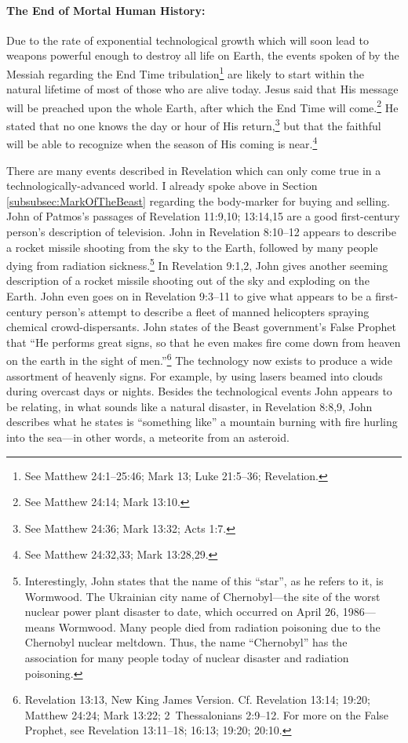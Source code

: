 \documentclass[letterpaper,12pt]{article}
\begin{document}
\paragraph{The End of Mortal Human History:}
\label{parag:EndOfMortalHumanHistory}

Due to the rate of exponential technological growth which will soon lead to weapons powerful enough to destroy all life on Earth, the events spoken of by the Messiah regarding the End Time tribulation\footnote{See Matthew 24:1--25:46; Mark 13; Luke 21:5--36; Revelation.} are likely to start within the natural lifetime of most of those who are alive today. Jesus said that His message will be preached upon the whole Earth, after which the End Time will come.\footnote{See Matthew 24:14; Mark 13:10.} He stated that no one knows the day or hour of His return,\footnote{See Matthew 24:36; Mark 13:32; Acts 1:7.} but that the faithful will be able to recognize when the season of His coming is near.\footnote{See Matthew 24:32,33; Mark 13:28,29.}

There are many events described in Revelation which can only come true in a technologically-advanced world. I already spoke above in Section \ref{subsubsec:MarkOfTheBeast} regarding the body-marker for buying and selling. John of Patmos's passages of Revelation 11:9,10; 13:14,15 are a good first-century person's description of television. John in Revelation 8:10--12 appears to describe a rocket missile shooting from the sky to the Earth, followed by many people dying from radiation sickness.\footnote{Interestingly, John states that the name of this ``star'', as he refers to it, is Wormwood. The Ukrainian city name of Chernobyl---the site of the worst nuclear power plant disaster to date, which occurred on April 26, 1986---means Wormwood. Many people died from radiation poisoning due to the Chernobyl nuclear meltdown. Thus, the name ``Chernobyl'' has the association for many people today of nuclear disaster and radiation poisoning.} In Revelation 9:1,2, John gives another seeming description of a rocket missile shooting out of the sky and exploding on the Earth. John even goes on in Revelation 9:3--11 to give what appears to be a first-century person's attempt to describe a fleet of manned helicopters spraying chemical crowd-dispersants. John states of the Beast government's False Prophet that ``He performs great signs, so that he even makes fire come down from heaven on the earth in the sight of men.''\footnote{Revelation 13:13, New King James Version. Cf. Revelation 13:14; 19:20; Matthew 24:24; Mark 13:22; 2~Thessalonians 2:9--12. For more on the False Prophet, see Revelation 13:11--18; 16:13; 19:20; 20:10.} The technology now exists to produce a wide assortment of heavenly signs. For example, by using lasers beamed into clouds during overcast days or nights. Besides the technological events John appears to be relating, in what sounds like a natural disaster, in Revelation 8:8,9, John describes what he states is ``something like'' a mountain burning with fire hurling into the sea---in other words, a meteorite from an asteroid.
\end{document}
